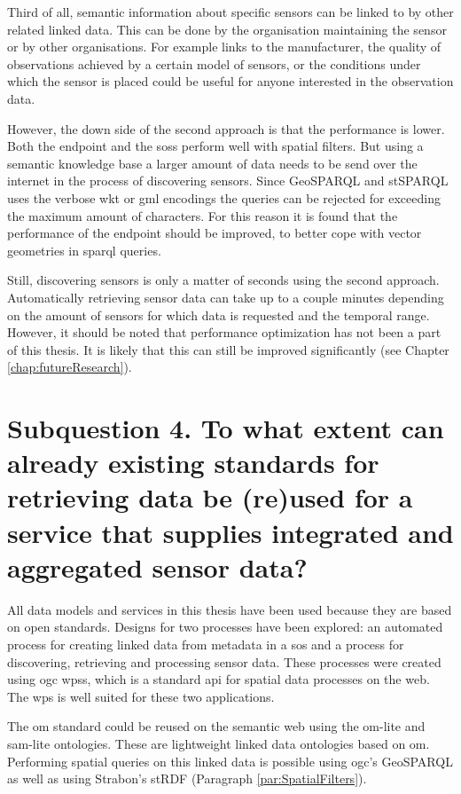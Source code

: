 Third of all, semantic information about specific sensors can be linked to by other related linked data. This can be done by the organisation maintaining the sensor or by other organisations. For example links to the manufacturer, the quality of observations achieved by a certain model of sensors, or the conditions under which the sensor is placed could be useful for anyone interested in the observation data. 

However, the down side of the second approach is that the performance is lower. Both the endpoint and the \aclp{sos} perform well with spatial filters. But using a semantic knowledge base a larger amount of data needs to be send over the internet in the process of discovering sensors. Since GeoSPARQL and stSPARQL uses the verbose \ac{wkt} or \ac{gml} encodings the queries can be rejected for exceeding the maximum amount of characters. For this reason it is found that the performance of the endpoint should be improved, to better cope with vector geometries in \ac{sparql} queries. 

Still, discovering sensors is only a matter of seconds using the second approach. Automatically retrieving sensor data can take up to a couple minutes depending on the amount of sensors for which data is requested and the temporal range. However, it should be noted that performance optimization has not been a part of this thesis. It is likely that this can still be improved significantly (see Chapter \ref{chap:futureResearch}).              


\section*{\textbf{Subquestion 4.} To what extent can already existing standards for retrieving data be (re)used for a service that supplies integrated and aggregated sensor data?}%

All data models and services in this thesis have been used because they are based on open standards. Designs for two processes have been explored: an automated process for creating linked data from metadata in a \ac{sos} and a process for discovering, retrieving and processing sensor data. These processes were created using \ac{ogc} \aclp{wps}, which is a standard \ac{api} for spatial data processes on the web. The \ac{wps} is well suited for these two applications.

The \ac{om} standard could be reused on the semantic web using the om-lite and sam-lite ontologies. These are lightweight linked data ontologies based on \ac{om}. Performing spatial queries on this linked data is possible using \ac{ogc}'s GeoSPARQL as well as using Strabon's stRDF (Paragraph \ref{par:SpatialFilters}).

